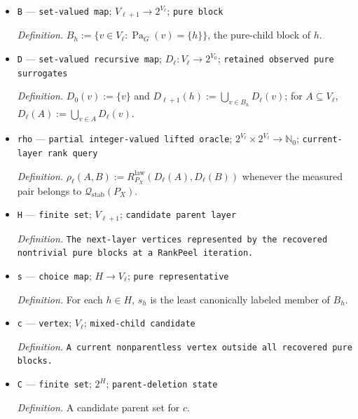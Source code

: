 \documentclass{article}
\begin{document}
\begin{itemize}
  \par\smallskip\noindent\emph{Definition.} \texttt{The unchanged scalar layered-\allowbreak{}DAG class of Prashant,\allowbreak{} Ng,\allowbreak{} Zhang,\allowbreak{} and Huang equipped with its observed law.}
  \item \texttt{B} --- \texttt{set-\allowbreak{}valued map}; \(V_{\ell+1}\to2^{V_\ell}\); \texttt{pure block}
  \par\smallskip\noindent\emph{Definition.} \(B_h:=\{v\in V_\ell:\operatorname{Pa}_G(v)=\{h\}\}\), the pure-child block of \(h\).
  \item \texttt{D} --- \texttt{set-\allowbreak{}valued recursive map}; \(D_\ell:V_\ell\to2^{V_0}\); \texttt{retained observed pure surrogates}
  \par\smallskip\noindent\emph{Definition.} \(D_0(v):=\{v\}\) and \(D_{\ell+1}(h):=\bigcup_{v\in B_h}D_\ell(v)\); for \(A\subseteq V_\ell\), \(D_\ell(A):=\bigcup_{v\in A}D_\ell(v)\).
  \item \texttt{rho} --- \texttt{partial integer-\allowbreak{}valued lifted oracle}; \(2^{V_\ell}\times2^{V_\ell}\to\mathbb N_0\); \texttt{current-\allowbreak{}layer rank query}
  \par\smallskip\noindent\emph{Definition.} \(\rho_\ell(A,B):=R^{\mathrm{law}}_{P_X}(D_\ell(A),D_\ell(B))\) whenever the measured pair belongs to \(\mathcal Q_{\mathrm{stab}}(P_X)\).
  \item \texttt{H} --- \texttt{finite set}; \(V_{\ell+1}\); \texttt{candidate parent layer}
  \par\smallskip\noindent\emph{Definition.} \texttt{The next-\allowbreak{}layer vertices represented by the recovered nontrivial pure blocks at a RankPeel iteration.}
  \item \texttt{s} --- \texttt{choice map}; \(H\to V_\ell\); \texttt{pure representative}
  \par\smallskip\noindent\emph{Definition.} For each \(h\in H\), \(s_h\) is the least canonically labeled member of \(B_h\).
  \item \texttt{c} --- \texttt{vertex}; \(V_\ell\); \texttt{mixed-\allowbreak{}child candidate}
  \par\smallskip\noindent\emph{Definition.} \texttt{A current nonparentless vertex outside all recovered pure blocks.}
  \item \texttt{C} --- \texttt{finite set}; \(2^H\); \texttt{parent-\allowbreak{}deletion state}
  \par\smallskip\noindent\emph{Definition.} A candidate parent set for \(c\).

\end{itemize}
\end{document}
